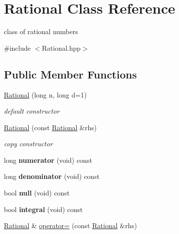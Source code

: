 \hypertarget{classRational}{}\section{Rational Class Reference}
\label{classRational}


class of rational numbers  




{\ttfamily \#include $<$Rational.\+hpp$>$}

\subsection*{Public Member Functions}
\begin{DoxyCompactItemize}
\item 
\mbox{\hyperlink{group__general_ga664c91d4ee5ad46c39e765e6dbf81738}{Rational}} (long n, long d=1)
\begin{DoxyCompactList}\small\item\em default constructor \end{DoxyCompactList}\item 
\mbox{\label{classRational_a6b1b6f2daa26e70c89c9af95ccd8db9f}} 
\mbox{\hyperlink{classRational_a6b1b6f2daa26e70c89c9af95ccd8db9f}{Rational}} (const \mbox{\hyperlink{classRational}{Rational}} \&rhs)
\begin{DoxyCompactList}\small\item\em copy constructor \end{DoxyCompactList}\item 
\mbox{\label{classRational_a72439b140815591f5d970494602bb5ad}} 
long {\bfseries numerator} (void) const
\item 
\mbox{\label{classRational_a291c66d689ce98e62a14babdd12894d8}} 
long {\bfseries denominator} (void) const
\item 
\mbox{\label{classRational_a53d55d82fbde5bdd6deb7f7ff4310f92}} 
bool {\bfseries null} (void) const
\item 
\mbox{\label{classRational_a1961c2ea3ed798d2c77a1294fa448164}} 
bool {\bfseries integral} (void) const
\item 
\mbox{\hyperlink{classRational}{Rational}} \& \mbox{\hyperlink{group__general_ga1f7f9f9491bbe7f24c488a505ac6887c}{operator=}} (const \mbox{\hyperlink{classRational}{Rational}} \&rhs)

\end{DoxyCompactItemize}
